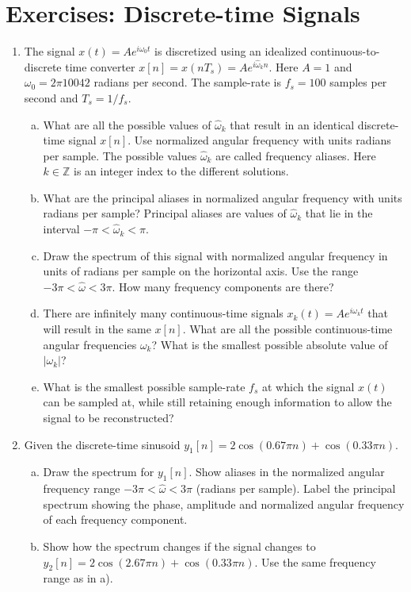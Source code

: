 \newpage
\section{Exercises: Discrete-time Signals}

\begin{enumerate}
\item The signal $x(t) = A e^{i\omega_0 t}$ is discretized using an idealized continuous-to-discrete time converter $x[n]=x(n T_s)=Ae^{i\hat{\omega}_{k}n}$. Here $A=1$ and $\omega_0=2\pi 10042$ radians per second. The sample-rate is $f_s=100$ samples per second and $T_s=1/f_s$.
\begin{enumerate}[a)]
\item What are all the possible values of $\hat{\omega}_k$ that result in an identical discrete-time signal $x[n]$. Use normalized angular frequency with units radians per sample. The possible values $\hat{\omega}_k$ are called frequency aliases. Here $k\in \mathbb{Z}$ is an integer index to the different solutions.
\item What are the principal aliases in normalized angular frequency with units radians per sample? Principal aliases are values of $\hat{\omega}_k$ that lie in the interval $-\pi < \hat{\omega}_k < \pi$.
\item Draw the spectrum of this signal with normalized angular frequency in units of radians per sample on the horizontal axis. Use the range $-3\pi < \hat{\omega} < 3\pi$. How many frequency components are there?
\item There are infinitely many continuous-time signals $x_k(t)=A e^{i\omega_k t}$ that will result in the same $x[n]$. What are all the possible continuous-time angular frequencies $\omega_k$? What is the smallest possible absolute value of $|\omega_k|$?
\item What is the smallest possible sample-rate $f_s$ at which the signal $x(t)$ can be sampled at, while still retaining enough information to allow the signal to be reconstructed?
\end{enumerate}

\item Given the discrete-time sinusoid $y_1[n] = 2 \cos(0.67 \pi n) + \cos(0.33 \pi n)$.
\begin{enumerate}[a)]
\item Draw the spectrum for $y_1[n]$. Show aliases in the normalized angular frequency range $-3\pi < \hat{\omega} < 3\pi$ (radians per sample). Label the principal spectrum showing the phase, amplitude and normalized angular frequency of each frequency component.
\item Show how the spectrum changes if the signal changes to $y_2[n] = 2 \cos(2.67 \pi n) + \cos(0.33 \pi n)$. Use the same frequency range as in a).
\end{enumerate}
  

\end{enumerate}
